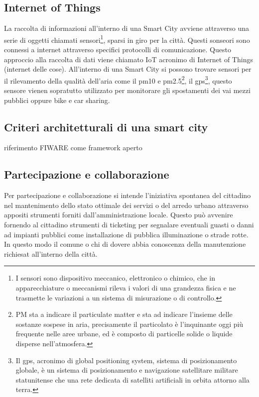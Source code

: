 \subsection{Internet of Things}
La raccolta di informazioni all'interno di una Smart City avviene attraverso una serie di oggetti chiamati sensori\footnote{I sensori sono dispositivo meccanico, elettronico o chimico, che in apparecchiature o meccanismi rileva i valori di una grandezza fisica e ne trasmette le variazioni a un sistema di misurazione o di controllo.}, sparsi in giro per la città. Questi sonseori sono connessi a internet attraverso specifici protocolli di comunicazione. Questo approccio alla raccolta di dati viene chiamato IoT acronimo di Internet of Things (internet delle cose).
All'interno di una Smart City si possono trovare sensori per il rilevamento della qualità dell'aria come il pm10 e pm2.5\footnote{PM sta a indicare il particulate matter e sta ad indicare l'insieme delle sostanze sospese in aria, precisamente il particolato è l'inquinante oggi più frequente nelle aree urbane, ed è composto di particelle solide o liquide disperse nell'atmosfera.}, il gps\footnote{Il gps, acronimo di global positioning system, sistema di posizionamento globale, è un sistema di posizionamento e navigazione satellitare militare statunitense che una rete dedicata di satelliti artificiali in orbita attorno alla terra.}, questo sensore vienen sopratutto utilizzato per monitorare gli spostamenti dei vai mezzi pubblici oppure bike e car sharing.

\subsection{Criteri architetturali di una smart city}
riferimento\cite{smart_city_architetture}
FIWARE come framework aperto 

\subsection{Partecipazione e collaborazione}
Per partecipazione e collaborazione si intende l’iniziativa spontanea del cittadino nel mantenimento dello stato ottimale dei servizi o del arredo urbano attraverso appositi strumenti forniti dall'amministrazione locale. Questo può avvenire fornendo al cittadino strumenti di ticketing per segnalare eventuali guasti o danni ad impianti pubblici come installazione di pubblica illuminazione o strade rotte. In questo modo il comune o chi di dovere abbia conoscenza della manutenzione richiesat all'interno della città.

